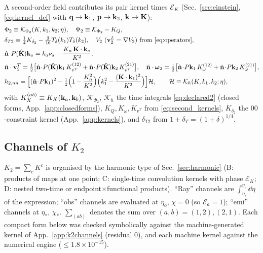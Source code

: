 A second-order field contributes its pair kernel times $\mathcal E_K$ (Sec.~\ref{sec:einstein}, \eqref{eq:kernel_def} with $\mathbf q\to\mathbf k_1$,
$\mathbf p\to\mathbf k_2$, $\mathbf k\to\mathbf K$):
\begin{align}
&\Phi_2\equiv\mathcal K_{\Phi_2}(K,k_1,k_2;\eta),\quad \Psi_2\equiv\mathcal K_{\Phi_2}-K_Q,\nonumber\\
&\delta_{T2}\equiv\tfrac14K_{\delta_2}-\tfrac3{16}T_\delta(k_1)T_\delta(k_2),\quad V_2\ (\vv^L_2=\nabla V_2)\ \text{from \eqref{eq:operators}},\nonumber\\
&\nhat\!\cdot\!P(\Khat)\vk_a=k_a\nu_a-\frac{K_n\,\vK\cdot\vk_a}{K^2},\nonumber\\
&\nhat\cdot\vv^T_2=\tfrac12\big[\nhat\!\cdot\!P(\Khat)\vk_1\,K^{(12)}_{v^T}+\nhat\!\cdot\!P(\Khat)\vk_2\,K^{(21)}_{v^T}\big],\quad
\nhat\cdot\boldsymbol\omega_2=\tfrac12\big[\nhat\!\cdot\!P\vk_1\,K^{(12)}_{\omega}+\nhat\!\cdot\!P\vk_2\,K^{(21)}_{\omega}\big],\nonumber\\
&h_{2,nn}=\Big[(\nhat\!\cdot\!P\vk_1)^2-\tfrac12\Big(1-\frac{K_n^2}{K^2}\Big)\Big(k_1^2-\frac{(\vK\cdot\vk_1)^2}{K^2}\Big)\Big]\mathcal H,\qquad
\mathcal H\equiv\mathcal K_h(K,k_1,k_2;\eta),
\label{eq:asm-second}
\end{align}
with $K^{(ab)}_X\equiv K_X(\mathbf k_a,\mathbf k_b)$, $\mathcal K_{\Phi_2}$, $\mathcal K_h$ the time integrals \eqref{eq:declared2} (closed forms, App.~\ref{app:closedforms}),
$K_Q,K_\omega,K_{v^T}$ from \eqref{eq:second_kernels}, $K_{\delta_2}$ the $00$-constraint kernel (App.~\ref{app:kernels}), and
$\delta_{T2}$ from $1+\delta_T=(1+\delta)^{1/4}$.

\subsection{Channels of \texorpdfstring{$K_2$}{K2}}
\label{sec:asm-channels}
$K_2=\sum_cK^c$ is organised by the harmonic type of Sec.~\ref{sec:harmonic} (B: products of maps at one point; C: single-time
convolution kernels with phase $\mathcal E_K$; D: nested two-time or endpoint$\times$functional products).  ``Ray'' channels are
$\int_{\eta_*}^{\eta_o}\dd\eta$ of the expression; ``obs'' channels are evaluated at $\eta_o$, $\chi=0$ (so $\mathcal E_a=1$); ``emi'' channels at
$\eta_*$, $\chi_*$.  $\sum_{(ab)}$ denotes the sum over $(a,b)=(1,2),(2,1)$.  Each compact form below was checked symbolically against
the machine-generated kernel of App.~\ref{app:k2channels} (residual $0$), and each machine kernel against the numerical engine
($\le1.8\times10^{-15}$).

